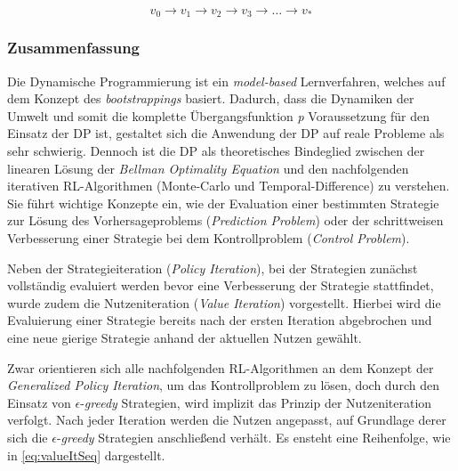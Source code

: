 \begin{equation}\label{eq:valueItSeq}
    v_0 \rightarrow v_1 \rightarrow v_2 \rightarrow v_3 \rightarrow \dots \rightarrow v_*
\end{equation}

\subsubsection{Zusammenfassung}
Die Dynamische Programmierung ist ein \textit{model-based} Lernverfahren, welches auf dem Konzept des \textit{bootstrappings} basiert. Dadurch, dass die Dynamiken der Umwelt und somit die komplette Übergangsfunktion \textit{p} Voraussetzung für den Einsatz der DP ist, gestaltet sich die Anwendung der DP auf reale Probleme als sehr schwierig.
\newpage
Dennoch ist die DP als theoretisches Bindeglied zwischen der linearen Lösung der \textit{Bellman Optimality Equation} und den nachfolgenden iterativen RL-Algorithmen (Monte-Carlo und Temporal-Difference) zu verstehen. Sie führt wichtige Konzepte ein, wie der Evaluation einer bestimmten Strategie zur Lösung des Vorhersageproblems (\textit{Prediction Problem}) oder der schrittweisen Verbesserung einer Strategie bei dem Kontrollproblem (\textit{Control Problem}).
\par
Neben der Strategieiteration (\textit{Policy Iteration}), bei der Strategien zunächst vollständig evaluiert werden bevor eine Verbesserung der Strategie stattfindet, wurde zudem die Nutzeniteration (\textit{Value Iteration}) vorgestellt. Hierbei wird die Evaluierung einer Strategie bereits nach der ersten Iteration abgebrochen und eine neue gierige Strategie anhand der aktuellen Nutzen gewählt.
\par
Zwar orientieren sich alle nachfolgenden RL-Algorithmen an dem Konzept der \textit{Generalized Policy Iteration}, um das Kontrollproblem zu lösen, doch durch den Einsatz von $\epsilon$-\textit{greedy} Strategien, wird implizit das Prinzip der Nutzeniteration verfolgt. Nach jeder Iteration werden die Nutzen angepasst, auf Grundlage derer sich die $\epsilon$-\textit{greedy} Strategien anschließend verhält. Es ensteht eine Reihenfolge, wie in \ref{eq:valueItSeq} dargestellt.